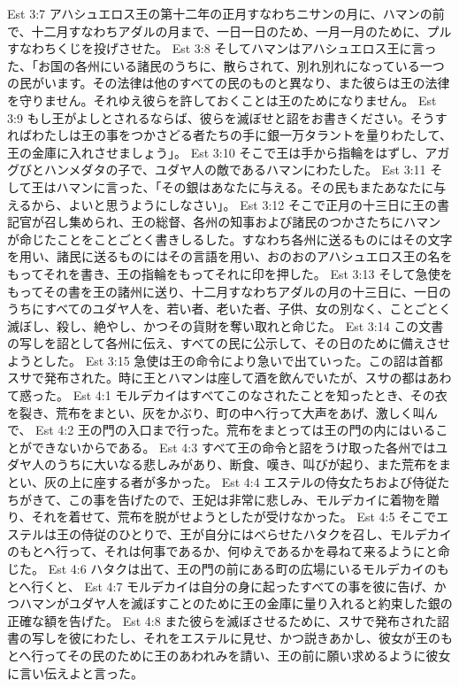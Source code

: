 Est 3:7  アハシュエロス王の第十二年の正月すなわちニサンの月に、ハマンの前で、十二月すなわちアダルの月まで、一日一日のため、一月一月のために、プルすなわちくじを投げさせた。
Est 3:8  そしてハマンはアハシュエロス王に言った、「お国の各州にいる諸民のうちに、散らされて、別れ別れになっている一つの民がいます。その法律は他のすべての民のものと異なり、また彼らは王の法律を守りません。それゆえ彼らを許しておくことは王のためになりません。
Est 3:9  もし王がよしとされるならば、彼らを滅ぼせと詔をお書きください。そうすればわたしは王の事をつかさどる者たちの手に銀一万タラントを量りわたして、王の金庫に入れさせましょう」。
Est 3:10  そこで王は手から指輪をはずし、アガグびとハンメダタの子で、ユダヤ人の敵であるハマンにわたした。
Est 3:11  そして王はハマンに言った、「その銀はあなたに与える。その民もまたあなたに与えるから、よいと思うようにしなさい」。
Est 3:12  そこで正月の十三日に王の書記官が召し集められ、王の総督、各州の知事および諸民のつかさたちにハマンが命じたことをことごとく書きしるした。すなわち各州に送るものにはその文字を用い、諸民に送るものにはその言語を用い、おのおのアハシュエロス王の名をもってそれを書き、王の指輪をもってそれに印を押した。
Est 3:13  そして急使をもってその書を王の諸州に送り、十二月すなわちアダルの月の十三日に、一日のうちにすべてのユダヤ人を、若い者、老いた者、子供、女の別なく、ことごとく滅ぼし、殺し、絶やし、かつその貨財を奪い取れと命じた。
Est 3:14  この文書の写しを詔として各州に伝え、すべての民に公示して、その日のために備えさせようとした。
Est 3:15  急使は王の命令により急いで出ていった。この詔は首都スサで発布された。時に王とハマンは座して酒を飲んでいたが、スサの都はあわて惑った。
Est 4:1  モルデカイはすべてこのなされたことを知ったとき、その衣を裂き、荒布をまとい、灰をかぶり、町の中へ行って大声をあげ、激しく叫んで、
Est 4:2  王の門の入口まで行った。荒布をまとっては王の門の内にはいることができないからである。
Est 4:3  すべて王の命令と詔をうけ取った各州ではユダヤ人のうちに大いなる悲しみがあり、断食、嘆き、叫びが起り、また荒布をまとい、灰の上に座する者が多かった。
Est 4:4  エステルの侍女たちおよび侍従たちがきて、この事を告げたので、王妃は非常に悲しみ、モルデカイに着物を贈り、それを着せて、荒布を脱がせようとしたが受けなかった。
Est 4:5  そこでエステルは王の侍従のひとりで、王が自分にはべらせたハタクを召し、モルデカイのもとへ行って、それは何事であるか、何ゆえであるかを尋ねて来るようにと命じた。
Est 4:6  ハタクは出て、王の門の前にある町の広場にいるモルデカイのもとへ行くと、
Est 4:7  モルデカイは自分の身に起ったすべての事を彼に告げ、かつハマンがユダヤ人を滅ぼすことのために王の金庫に量り入れると約束した銀の正確な額を告げた。
Est 4:8  また彼らを滅ぼさせるために、スサで発布された詔書の写しを彼にわたし、それをエステルに見せ、かつ説きあかし、彼女が王のもとへ行ってその民のために王のあわれみを請い、王の前に願い求めるように彼女に言い伝えよと言った。
